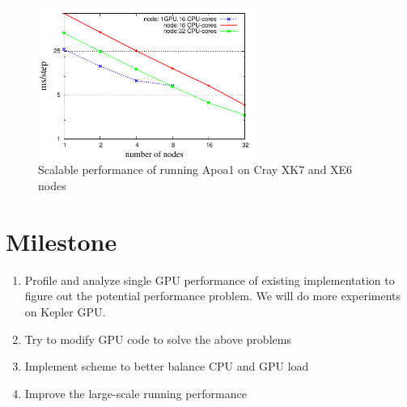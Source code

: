 \documentclass[11pt,onecolumn]{article}
\begin{document}
\begin{figure}[h]
\centering
\includegraphics[width=2.8in]{figs/cpu-gpu-jyc-apoa1}
\caption{Scalable performance of running Apoa1 on Cray XK7 and XE6 nodes }
\label{figs:apoa1-gpu-scale-JYC}
\vspace{-0.2cm}
\end{figure}

\section{Milestone}
\begin{enumerate}

\item Profile and analyze single GPU performance of existing implementation to figure 
out the potential performance problem.  We will do more experiments on Kepler GPU. 
\item Try to modify GPU code to solve the above problems
\item Implement scheme to better balance CPU and GPU load 
\item Improve the large-scale running performance

\end{enumerate}



\end{document}
